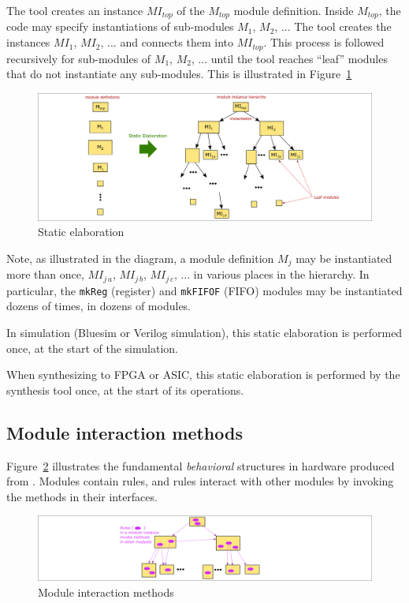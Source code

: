 The tool creates an instance $MI_{top}$ of the $M_{top}$ module
definition. Inside $M_{top}$, the code may specify instantiations of
sub-modules $M_1$, $M_2$, ...  The tool creates the instances $MI_1$,
$MI_2$, ...  and connects them into $MI_{top}$.  This process is
followed recursively for sub-modules of $M_1$, $M_2$, ... until the
tool reaches ``leaf'' modules that do not instantiate any sub-modules.
This is illustrated in Figure~\ref{Fig_BSV_static_elaboration}
\begin{figure}[htbp]
  \centerline{\includegraphics[width=6in,angle=0]{Figures/Fig_BSV_static_elaboration}}
  \caption{\label{Fig_BSV_static_elaboration} Static elaboration}
\end{figure}

Note, as illustrated in the diagram, a module definition $M_j$ may be
instantiated more than once, $MI_{j\,a}$, $MI_{j\,b}$, $MI_{j\,c}$,
... in various places in the hierarchy.  In particular, the
\verb|mkReg| (register) and \verb|mkFIFOF| (FIFO) modules may be
instantiated dozens of times, in dozens of modules.

In simulation (Bluesim or Verilog simulation), this static elaboration
is performed once, at the start of the simulation.

When synthesizing to FPGA or ASIC, this static elaboration is
performed by the synthesis tool once, at the start of its operations.


\subsection{Module interaction {\via} methods}

\label{Sec_module_interaction_via_methods}


Figure~\ref{Fig_BSV_module_interaction} illustrates the fundamental
\emph{behavioral} structures in hardware produced from {\BSV}.  Modules
contain rules, and rules interact with other modules by invoking the
methods in their interfaces.
\begin{figure}[htbp]
  \centerline{\includegraphics[width=6in,angle=0]{Figures/Fig_BSV_module_interaction}}
  \caption{\label{Fig_BSV_module_interaction}
           Module interaction {\via} methods}
\end{figure}

